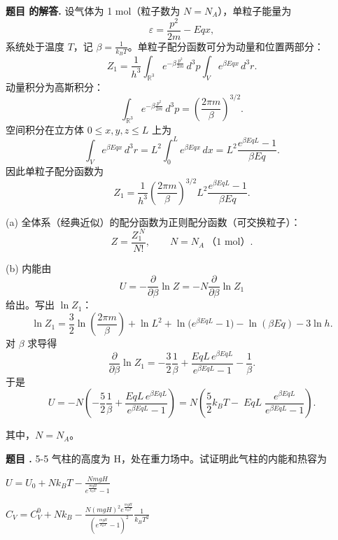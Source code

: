 \documentclass[12pt, a4paper, oneside]{ctexart}
\newcounter{problemname}
\newenvironment{problem}
  {\begin{shaded}\stepcounter{problemname}\par\noindent\textbf{题目 \theproblemname. }}
  {\end{shaded}\par}
\newenvironment{solution}
  {\par\noindent\textbf{题目 \theproblemname 的解答. }}
  {\par}
\begin{document}
\begin{solution}
    设气体为 1 mol（粒子数为 \(N=N_A\)），单粒子能量为
\[
\varepsilon=\frac{p^2}{2m}-E q x,
\]
系统处于温度 \(T\)，记 \(\beta=\frac{1}{k_B T}\)。单粒子配分函数可分为动量和位置两部分：
\[
Z_1=\frac{1}{h^3}\int_{\mathbb{R}^3}e^{-\beta\frac{p^2}{2m}}\,d^3p
\int_{V}e^{\beta E q x}\,d^3r.
\]
动量积分为高斯积分：
\[
\int_{\mathbb{R}^3}e^{-\beta\frac{p^2}{2m}}\,d^3p
=\left(\frac{2\pi m}{\beta}\right)^{3/2}.
\]
空间积分在立方体 \(0\le x,y,z\le L\) 上为
\[
\int_{V}e^{\beta E q x}\,d^3r
= L^2\int_0^L e^{\beta E q x}\,dx
= L^2\frac{e^{\beta E q L}-1}{\beta E q}.
\]
因此单粒子配分函数为
\[
Z_1=\frac{1}{h^3}\left(\frac{2\pi m}{\beta}\right)^{3/2}
L^2\frac{e^{\beta E q L}-1}{\beta E q}.
\]

(a) 全体系（经典近似）的配分函数为正则配分函数（可交换粒子）：
\[
Z=\frac{Z_1^{\,N}}{N!},\qquad N=N_A\ \text{（1 mol）}.
\]

(b) 内能由
\[
U=-\frac{\partial}{\partial\beta}\ln Z
=-N\frac{\partial}{\partial\beta}\ln Z_1
\]
给出。写出 \(\ln Z_1\)：
\[
\ln Z_1=\frac{3}{2}\ln\!\left(\frac{2\pi m}{\beta}\right)
+\ln L^2+\ln\!\big(e^{\beta E q L}-1\big)-\ln(\beta E q)-3\ln h.
\]
对 \(\beta\) 求导得
\[
\frac{\partial}{\partial\beta}\ln Z_1
=-\frac{3}{2}\frac{1}{\beta}
+\frac{E q L\,e^{\beta E q L}}{e^{\beta E q L}-1}-\frac{1}{\beta}.
\]
于是
\[
U=-N\left(-\frac{5}{2}\frac{1}{\beta}
+\frac{E q L\,e^{\beta E q L}}{e^{\beta E q L}-1}\right)
= N\left(\frac{5}{2}k_B T-\;E q L\;\frac{e^{\beta E q L}}{e^{\beta E q L}-1}\right).
\]

其中，$N = N_A$。
\end{solution}

\begin{problem}{5-5}
  气柱的高度为 H，处在重力场中。试证明此气柱的内能和热容为

  \centerline{$U = U_0 + N k_B T - \frac{N m g H}{e^{\frac{m g H}{k_B T}} - 1}$}

  \centerline{$C_V = C_V^0 + N k_B - \frac{N (mgH)^2 e^{\frac{mgH}{k_B T}}}{\left( e^{\frac{mgH}{k_B T}} - 1 \right)^2} \frac{1}{k_B T^2}$}
\end{problem}
\end{document}
